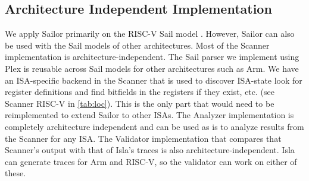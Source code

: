 \subsection{Architecture Independent Implementation} 
\label{sec:arch-indep}
We apply Sailor primarily on the RISC-V Sail model \cite{sail-riscv}. 
However, Sailor can also be used with the Sail models of other architectures. 
Most of the Scanner implementation is architecture-independent. 
The Sail parser we implement using Plex is reusable across Sail models for other architectures such as Arm. 
We have an ISA-specific backend in the Scanner that is used to discover ISA-state \eg{} look for register definitions and find bitfields in the registers if they exist, etc. (see Scanner RISC-V in \autoref{tab:loc}). 
This is the only part that would need to be reimplemented to extend Sailor to other ISAs. 
The Analyzer implementation is completely architecture independent and can be used as is to analyze results from the Scanner for any ISA. 
The Validator implementation that compares that Scanner's output with that of Isla's traces is also architecture-independent. 
Isla can generate traces for Arm and RISC-V, so the validator can work on either of these.


